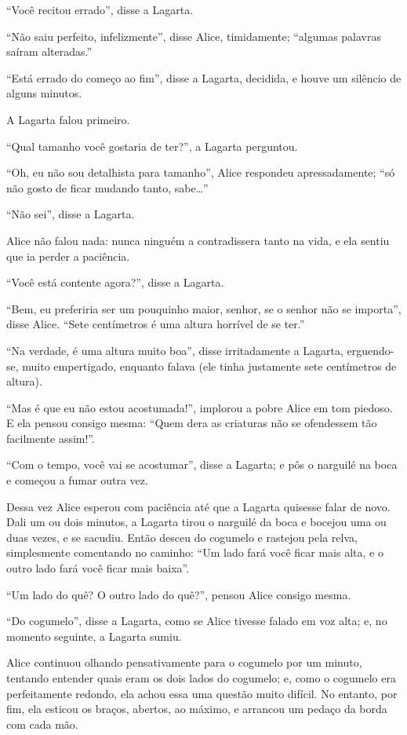 ``Você recitou errado'', disse a Lagarta.

``Não saiu perfeito, infelizmente'', disse Alice, timidamente; ``algumas
palavras saíram alteradas.''

``Está errado do começo ao fim'', disse a Lagarta, decidida, e houve um
silêncio de alguns minutos.

A Lagarta falou primeiro.

``Qual tamanho você gostaria de ter?'', a Lagarta perguntou.

``Oh, eu não sou detalhista para tamanho'', Alice respondeu
apressadamente; ``só não gosto de ficar mudando tanto, sabe\ldots{}''

``Não sei'', disse a Lagarta.

Alice não falou nada: nunca ninguém a contradissera tanto na vida, e ela
sentiu que ia perder a paciência.

``Você está contente agora?'', disse a Lagarta.

``Bem, eu preferiria ser um pouquinho maior, senhor, se o senhor não se
importa'', disse Alice. ``Sete centímetros é uma altura horrível de se
ter.''

``Na verdade, é uma altura muito boa'', disse irritadamente a Lagarta,
erguendo-se, muito empertigado, enquanto falava (ele tinha justamente
sete centímetros de altura).

``Mas é que eu não estou acostumada!'', implorou a pobre Alice em tom
piedoso. E ela pensou consigo mesma: ``Quem dera as criaturas não se
ofendessem tão facilmente assim!''.

``Com o tempo, você vai se acostumar'', disse a Lagarta; e pôs o
narguilé na boca e começou a fumar outra vez.

Dessa vez Alice esperou com paciência até que a Lagarta quisesse falar
de novo. Dali um ou dois minutos, a Lagarta tirou o narguilé da boca e
bocejou uma ou duas vezes, e se sacudiu. Então desceu do cogumelo e
rastejou pela relva, simplesmente comentando no caminho: ``Um lado fará
você ficar mais alta, e o outro lado fará você ficar mais baixa''.

``Um lado do quê? O outro lado do quê?'', pensou Alice consigo mesma.

``Do cogumelo'', disse a Lagarta, como se Alice tivesse falado em voz
alta; e, no momento seguinte, a Lagarta sumiu.

Alice continuou olhando pensativamente para o cogumelo por um minuto,
tentando entender quais eram os dois lados do cogumelo; e, como o
cogumelo era perfeitamente redondo, ela achou essa uma questão muito
difícil. No entanto, por fim, ela esticou os braços, abertos, ao máximo,
e arrancou um pedaço da borda com cada mão.

